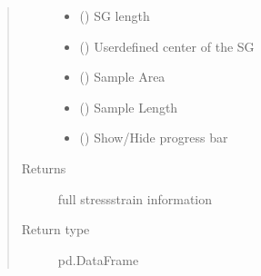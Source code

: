 \documentclass[letterpaper,10pt,english]{sphinxmanual}
\begin{document}
\begin{fulllineitems}
\begin{quote}
\begin{description}
\begin{itemize}
\item {} 
 () \textendash{} SG length

\item {} 
 (\sphinxstyleliteralemphasis{\sphinxupquote{{[}}}\sphinxstyleliteralemphasis{\sphinxupquote{, }}\sphinxstyleliteralemphasis{\sphinxupquote{, }}\sphinxstyleliteralemphasis{\sphinxupquote{{]}}}) \textendash{} User\sphinxhyphen{}defined center of the SG

\item {} 
 () \textendash{} Sample Area

\item {} 
 () \textendash{} Sample Length

\item {} 
 () \textendash{} Show/Hide progress bar

\end{itemize}

\item[{Returns}] \leavevmode
full stress\sphinxhyphen{}strain information

\item[{Return type}] \leavevmode
pd.DataFrame

\end{description}\end{quote}

\end{fulllineitems}

\end{document}
